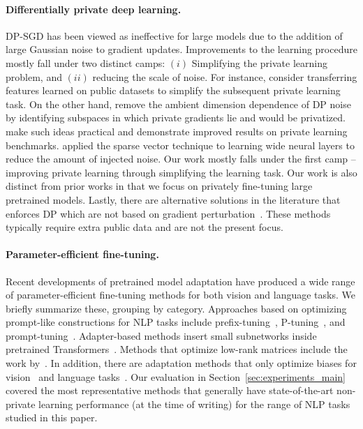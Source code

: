 \paragraph{Differentially private deep learning.}
DP-SGD has been viewed as ineffective for large models due to the addition of large Gaussian noise to gradient updates. 
Improvements to the learning procedure mostly fall under two distinct camps: $(i)$ Simplifying the private learning problem, and $(ii)$ reducing the scale of noise. 
For instance, \cite{papernot2019making,tramer2020differentially,abadi2016deep} consider transferring features learned on public datasets to simplify the subsequent private learning task. 
On the other hand, \cite{zhou2020bypassing,kairouz2020fast} remove the ambient dimension dependence of DP noise by identifying subspaces in which private gradients lie and would be privatized. 
\cite{yu2021not,yu2021large} make such ideas practical and demonstrate improved results on private learning benchmarks. 
\cite{zhang2021wide} applied the sparse vector technique to learning wide neural layers to reduce the amount of injected noise. 
Our work mostly falls under the first camp -- improving private learning through simplifying the learning task.
Our work is also distinct from prior works in that we focus on privately fine-tuning large pretrained models. 
Lastly, there are alternative solutions in the literature that enforces DP which are not based on gradient perturbation~\citep{papernot2018scalable,papernot2016semi}. 
These methods typically require extra public data and are not the present focus. 

\paragraph{Parameter-efficient fine-tuning.}
Recent developments of pretrained model adaptation have produced a wide range of parameter-efficient fine-tuning methods for both vision and language tasks.
We briefly summarize these, grouping by category. 
Approaches based on optimizing prompt-like constructions for NLP tasks include prefix-tuning~\citep{li2021prefix}, P-tuning~\citep{liu2021gpt}, and prompt-tuning~\citep{lester2021power}.
Adapter-based methods insert small subnetworks inside pretrained Transformers~\citep{houlsby2019parameter,ruckle2020adapterdrop,pfeiffer2020adapterfusion}.
Methods that optimize low-rank matrices include the work by~\cite{hu2021lora,mahabadi2021compacter}.
In addition, there are adaptation methods that only optimize biases for vision~\citep{cai2020tinytl} and language tasks~\citep{ben2021bitfit}.
Our evaluation in Section~\ref{sec:experiments_main} covered the most representative methods that generally have state-of-the-art non-private learning performance (at the time of writing) for the range of NLP tasks studied in this paper.

